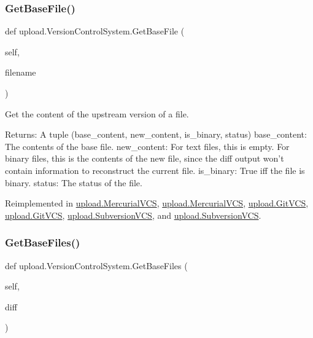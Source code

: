 \subsubsection{\texorpdfstring{GetBaseFile()}{GetBaseFile()}\hspace{0.1cm}{\footnotesize\ttfamily [2/2]}}
{\footnotesize\ttfamily def upload.\+Version\+Control\+System.\+Get\+Base\+File (\begin{DoxyParamCaption}\item[{}]{self,  }\item[{}]{filename }\end{DoxyParamCaption})}

\begin{DoxyVerb}Get the content of the upstream version of a file.

Returns:
  A tuple (base_content, new_content, is_binary, status)
base_content: The contents of the base file.
new_content: For text files, this is empty.  For binary files, this is
  the contents of the new file, since the diff output won't contain
  information to reconstruct the current file.
is_binary: True iff the file is binary.
status: The status of the file.
\end{DoxyVerb}
 

Reimplemented in \mbox{\hyperlink{classupload_1_1MercurialVCS_a0cdc0cbe6ac4daab82f5f01e6ae2e670}{upload.\+Mercurial\+V\+CS}}, \mbox{\hyperlink{classupload_1_1MercurialVCS_a0cdc0cbe6ac4daab82f5f01e6ae2e670}{upload.\+Mercurial\+V\+CS}}, \mbox{\hyperlink{classupload_1_1GitVCS_a70ddb65a6b512b8cb8cc4affa37ff9b4}{upload.\+Git\+V\+CS}}, \mbox{\hyperlink{classupload_1_1GitVCS_a70ddb65a6b512b8cb8cc4affa37ff9b4}{upload.\+Git\+V\+CS}}, \mbox{\hyperlink{classupload_1_1SubversionVCS_a29dec4941de0824734d6842a2f33ffc3}{upload.\+Subversion\+V\+CS}}, and \mbox{\hyperlink{classupload_1_1SubversionVCS_a29dec4941de0824734d6842a2f33ffc3}{upload.\+Subversion\+V\+CS}}.

\mbox{\label{classupload_1_1VersionControlSystem_a812c3b3daf90c88b015fa4b26252e291}} 
\subsubsection{\texorpdfstring{GetBaseFiles()}{GetBaseFiles()}\hspace{0.1cm}{\footnotesize\ttfamily [1/2]}}
{\footnotesize\ttfamily def upload.\+Version\+Control\+System.\+Get\+Base\+Files (\begin{DoxyParamCaption}\item[{}]{self,  }\item[{}]{diff }\end{DoxyParamCaption})}

